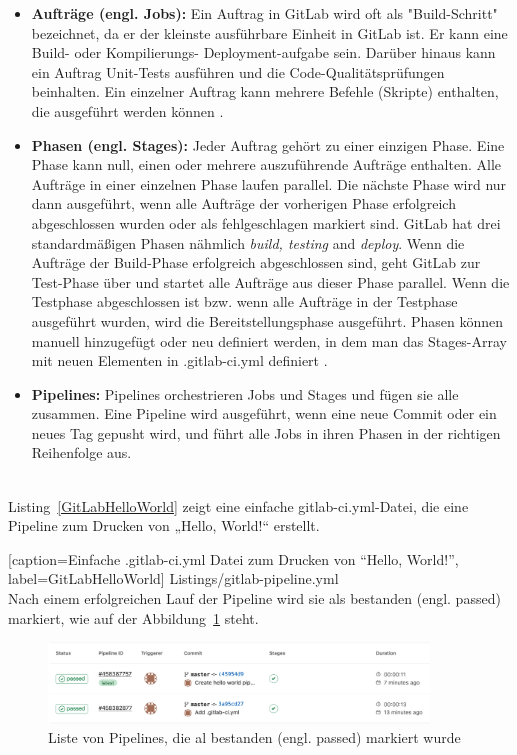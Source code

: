 \begin{itemize}
	
	\item \textbf{Aufträge (engl. Jobs):} Ein Auftrag in GitLab wird oft als "Build-Schritt" bezeichnet, da er der kleinste ausführbare Einheit in GitLab ist. Er kann eine Build- oder Kompilierungs- Deployment-aufgabe sein. Darüber hinaus kann ein Auftrag Unit-Tests ausführen und die Code-Qualitätsprüfungen beinhalten. Ein einzelner Auftrag kann mehrere Befehle (Skripte) enthalten, die ausgeführt werden können \cite{GitLab:jobs}.
	
	\item \textbf{Phasen (engl. Stages):} Jeder Auftrag gehört zu einer einzigen Phase. Eine Phase kann null, einen oder mehrere auszuführende Aufträge enthalten. Alle Aufträge in einer einzelnen Phase laufen parallel. Die nächste Phase wird nur dann ausgeführt, wenn alle Aufträge der vorherigen Phase erfolgreich abgeschlossen wurden oder als fehlgeschlagen markiert sind.
	GitLab hat drei standardmäßigen Phasen nähmlich \textit{build, testing} and \textit{deploy}. Wenn die Aufträge der Build-Phase erfolgreich abgeschlossen sind, geht GitLab zur Test-Phase über und startet alle Aufträge aus dieser Phase parallel. Wenn die Testphase abgeschlossen ist bzw. wenn alle Aufträge in der Testphase ausgeführt wurden, wird die Bereitstellungsphase ausgeführt. Phasen können manuell hinzugefügt oder neu definiert werden, in dem man das Stages-Array mit neuen Elementen in .gitlab-ci.yml definiert \cite{GitLab:stages}.
	
	\item \textbf{Pipelines:} Pipelines orchestrieren Jobs und Stages und fügen sie alle zusammen. Eine Pipeline wird ausgeführt, wenn eine neue Commit oder ein neues Tag gepusht wird, und führt alle Jobs in ihren Phasen in der richtigen Reihenfolge aus.
	
\end{itemize}
\ \\
Listing~\ref{GitLabHelloWorld} zeigt eine einfache gitlab-ci.yml-Datei, die eine Pipeline zum Drucken von „Hello, World!“ erstellt.


[caption={Einfache .gitlab-ci.yml Datei zum Drucken von “Hello, World!”}, label=GitLabHelloWorld]
{Listings/gitlab-pipeline.yml}
\ \\
Nach einem erfolgreichen Lauf der Pipeline wird sie als bestanden (engl. passed) markiert, wie auf der Abbildung~\ref{fig:GitLabPipeLinePassed} steht.

\begin{figure}[!htbp]%
	\centering
	\includegraphics[width=0.9\textwidth]{Graphics/GitLab-passed_pipeline.png}
	\caption{Liste von Pipelines, die al bestanden (engl. passed) markiert wurde}
	\label{fig:GitLabPipeLinePassed}
\end{figure}
 

